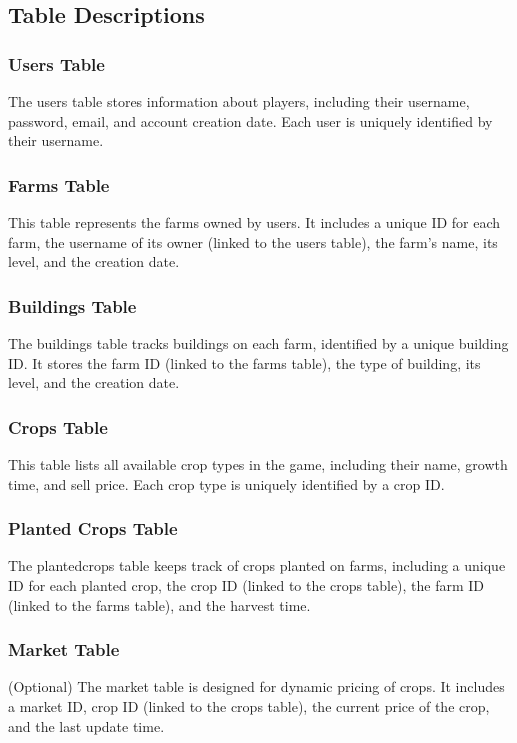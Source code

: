 \documentclass[12pt]{article}
\begin{document}
\subsection{Table Descriptions}

\subsubsection{Users Table}
The users table stores information about players, including their username, password, email, and account creation date. Each user is uniquely identified by their username.

\subsubsection{Farms Table}
This table represents the farms owned by users. It includes a unique ID for each farm, the username of its owner (linked to the users table), the farm's name, its level, and the creation date.

\subsubsection{Buildings Table}
The buildings table tracks buildings on each farm, identified by a unique building ID. It stores the farm ID (linked to the farms table), the type of building, its level, and the creation date.

\subsubsection{Crops Table}
This table lists all available crop types in the game, including their name, growth time, and sell price. Each crop type is uniquely identified by a crop ID.

\subsubsection{Planted Crops Table}
The planted\textunderscore crops table keeps track of crops planted on farms, including a unique ID for each planted crop, the crop ID (linked to the crops table), the farm ID (linked to the farms table), and the harvest time.

\subsubsection{Market Table}
(Optional) The market table is designed for dynamic pricing of crops. It includes a market ID, crop ID (linked to the crops table), the current price of the crop, and the last update time.
\end{document}
